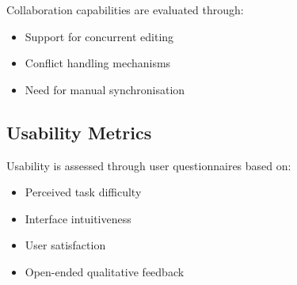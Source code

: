 Collaboration capabilities are evaluated through:

\begin{itemize}
\item Support for concurrent editing
\item Conflict handling mechanisms
\item Need for manual synchronisation
\end{itemize}

\subsection{Usability Metrics}

Usability is assessed through user questionnaires based on:

\begin{itemize}
\item Perceived task difficulty
\item Interface intuitiveness
\item User satisfaction
\item Open-ended qualitative feedback
\end{itemize}

